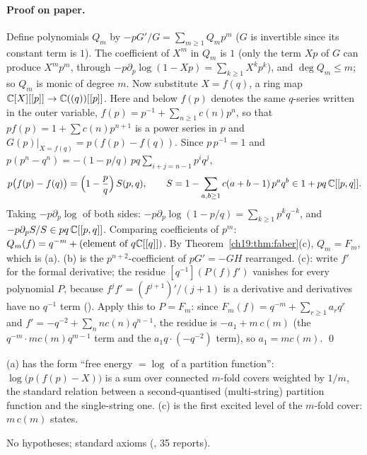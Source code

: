 \paragraph{Proof on paper.}  Define polynomials $Q_m$ by $-pG'/G=\sum_{m\ge1}Q_mp^m$ ($G$ is invertible since its constant
term is $1$).  The coefficient of $X^m$ in $Q_m$ is $1$ (only the term $Xp$ of $G$ can produce $X^mp^m$, through
$-p\partial_p\log(1-Xp)=\sum_{k\ge1}X^kp^k$), and $\deg Q_m\le m$; so $Q_m$ is monic of degree $m$.  Now substitute
$X=f(q)$, a ring map ${\mathbb{C}}[X][[p]]\to{\mathbb{C}}((q))[[p]]$.  Here and below $f(p)$ denotes the same $q$-series written in the outer
variable, $f(p)=p^{-1}+\sum_{n\ge1}c(n)p^n$, so that $pf(p)=1+\sum c(n)p^{n+1}$ is a power series in $p$ and
$G(p)|_{X=f(q)}=p(f(p)-f(q))$.  Since $p\,p^{-1}=1$ and $p(p^n-q^n)=-(1-p/q)\,pq\sum_{i+j=n-1}p^iq^j$,
\begin{equation}\label{ch19:eq:factor}
  p\bigl(f(p)-f(q)\bigr)=\Bigl(1-\frac pq\Bigr)\,S(p,q),\qquad S=1-\sum_{a,b\ge1}c(a+b-1)\,p^aq^b\in1+pq\,{\mathbb{C}}[[p,q]] .
\end{equation}
Taking $-p\partial_p\log$ of both sides: $-p\partial_p\log(1-p/q)=\sum_{k\ge1}p^kq^{-k}$, and $-p\partial_pS/S\in pq\,{\mathbb{C}}[[p,q]]$.
Comparing coefficients of $p^m$: $Q_m(f)=q^{-m}+(\text{element of }q{\mathbb{C}}[[q]])$.  By Theorem~\ref{ch19:thm:faber}(c),
$Q_m=F_m$, which is (a).  (b) is the $p^{n+2}$-coefficient of $pG'=-GH$ rearranged.  (c): write $f'$ for the formal
derivative; the residue $[q^{-1}](P(f)f')$ vanishes for every polynomial $P$, because $f^jf'=(f^{j+1})'/(j+1)$ is a
derivative and derivatives have no $q^{-1}$ term ().  Apply this to $P=F_m$: since
$F_m(f)=q^{-m}+\sum_{r\ge1}a_rq^r$ and $f'=-q^{-2}+\sum_{n}nc(n)q^{n-1}$, the residue is $-a_1+m\,c(m)$ (the
$q^{-m}\cdot mc(m)q^{m-1}$ term and the $a_1q\cdot(-q^{-2})$ term), so $a_1=mc(m)$. \qed
\begin{physics}
(a) has the form ``free energy $=\log$ of a partition function'': $\log\bigl(p(f(p)-X)\bigr)$ is a sum over connected
$m$-fold covers weighted by $1/m$, the standard relation between a second-quantised (multi-string) partition function and
the single-string one.  (c) is the first excited level of the $m$-fold cover: $m\,c(m)$ states.
\end{physics}
\begin{status}
No hypotheses; standard axioms (, 35 reports).
\end{status}

